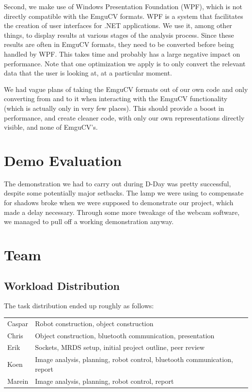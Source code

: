 \documentclass[10pt, abstracton, twocolumn]{scrartcl}
\begin{document}
\begin{appendices}
Second, we make use of Windows Presentation Foundation (WPF), which is not directly compatible with the EmguCV formats. WPF is a system that facilitates the creation of user interfaces for .NET applications. We use it, among other things, to display results at various stages of the analysis process. Since these results are often in EmguCV formats, they need to be converted before being handled by WPF. This takes time and probably has a large negative impact on performance. Note that one optimization we apply is to only convert the relevant data that the user is looking at, at a particular moment.

We had vague plans of taking the EmguCV formats out of our own code and only converting from and to it when interacting with the EmguCV functionality (which is actually only in very few places). This should provide a boost in performance, and create cleaner code, with only our own representations directly visible, and none of EmguCV's.

\section{Demo Evaluation}
The demonstration we had to carry out during D-Day was pretty successful, despite some potentially major setbacks. The lamp we were using to compensate for shadows broke when we were supposed to demonstrate our project, which made a delay necessary. Through some more tweakage of the webcam software, we managed to pull off a working demonstration anyway.

\section{Team}
\label{sec:team}

\subsection{Workload Distribution}

\begin{samepage}

The task distribution ended up roughly as follows:\\
\nolinebreak
\begin{tabularx}{3.2in}{ l | X }
Caspar & Robot construction, object construction \\ 
Chris & Object construction, bluetooth communication, presentation \\ 
Erik & Sockets, MRDS setup, initial project outline, peer review \\ 
Koen & Image analysis, planning, robot control, bluetooth communication, report \\ 
Marein & Image analysis, planning, robot control, report \\
\end{tabularx}\\


\end{samepage}
\end{appendices}
\end{document}
